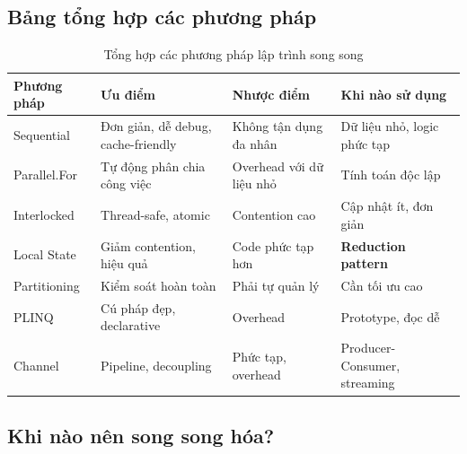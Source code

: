 \documentclass[12pt,a4paper]{article}
\begin{document}
\subsection{Bảng tổng hợp các phương pháp}

\begin{table}[h]
\centering
\footnotesize
\begin{tabular}{|l|p{2.5cm}|p{2.5cm}|p{3cm}|}
\hline
\textbf{Phương pháp} & \textbf{Ưu điểm} & \textbf{Nhược điểm} & \textbf{Khi nào sử dụng} \\
\hline
Sequential & Đơn giản, dễ debug, cache-friendly & Không tận dụng đa nhân & Dữ liệu nhỏ, logic phức tạp \\
\hline
Parallel.For & Tự động phân chia công việc & Overhead với dữ liệu nhỏ & Tính toán độc lập \\
\hline
Interlocked & Thread-safe, atomic & Contention cao & Cập nhật ít, đơn giản \\
\hline
Local State & Giảm contention, hiệu quả & Code phức tạp hơn & \textbf{Reduction pattern} \\
\hline
Partitioning & Kiểm soát hoàn toàn & Phải tự quản lý & Cần tối ưu cao \\
\hline
PLINQ & Cú pháp đẹp, declarative & Overhead & Prototype, đọc dễ \\
\hline
Channel & Pipeline, decoupling & Phức tạp, overhead & Producer-Consumer, streaming \\
\hline
\end{tabular}
\caption{Tổng hợp các phương pháp lập trình song song}
\end{table}

\subsection{Khi nào nên song song hóa?}
\end{document}
